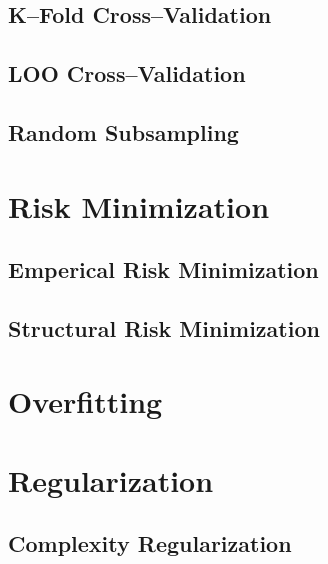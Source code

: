 \documentclass[18pt,a3paper,landscape, ncols=2]{cheatsheet}
\begin{document}
		\subsection{K--Fold Cross--Validation}
			\begin{mdframed}
			\end{mdframed}
		\subsection{LOO Cross--Validation}
			\begin{mdframed}
			\end{mdframed}
		\subsection{Random Subsampling}
			\begin{mdframed}
			\end{mdframed}

\section{Risk Minimization} \seperator
	\subsection{Emperical Risk Minimization}
		\begin{mdframed}
		\end{mdframed}
	\subsection{Structural Risk Minimization}
		\begin{mdframed}
		\end{mdframed}

\section{Overfitting} \seperator
	\begin{mdframed}
	\end{mdframed}

\section{Regularization} \seperator
	\subsection{Complexity Regularization}
		\begin{mdframed}
		\end{mdframed}
\end{document}
